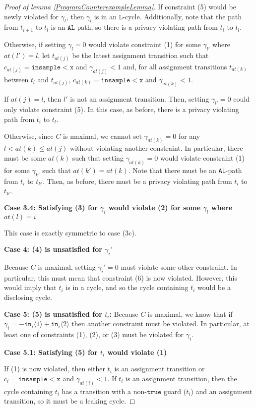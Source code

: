 \documentclass[12pt]{article}
\newcommand{\lguard}[1][x]{\texttt{insample} < #1}
\newcommand{\brangle}[1]{\langle#1 \rangle}
\theoremstyle{definition}
\begin{document}
\begin{proof}[Proof of lemma \ref{ProgramCounterexampleLemma}]
    If constraint (5) would be newly violated for $\gamma_l$, then $\gamma_l$ is in an $\texttt{L}$-cycle. Additionally, note that the path from $t_{i+1}$ to $t_l$ is an $\texttt{AL}$-path, so there is a privacy violating path from $t_i$ to $t_l$. 

    Otherwise, if setting $\gamma_l = 0$ would violate constraint (1) for some $\gamma_{l'}$ where $at(l')=l$, let $t_{at(j)}$ be the latest assignment transition such that $c_{at(j)} = \lguard[\texttt{x}]$ and $\gamma_{at(j)}<1$ and, for all assignment transitions $t_{at(k)}$ between $t_l$ and $t_{at(j)}$, $c_{at(k)} = \lguard[\texttt{x}]$ and $\gamma_{at(k)}<1$. 

    If $at(j) = l$, then $l'$ is not an assignment transition. Then, setting $\gamma_{l'} = 0$ could only violate constraint (5). In this case, as before, there is a privacy violating path from $t_i$ to $t_l$. 

    Otherwise, since $C$ is maximal, we cannot set $\gamma_{at(k)}=0$ for any $l<at(k)\leq at(j)$ without violating another constraint. In particular, there must be some $at(k)$ such that setting $\gamma_{at(k)} = 0$ would violate constraint (1) for some $\gamma_{k'}$ such that $at(k') = at(k)$. Note that there must be an \texttt{AL}-path from $t_i$ to $t_{k'}$. Then, as before, there must be a privacy violating path from $t_i$ to $t_{k'}$. 


    \textbf{Case 3.4: Satisfying (3) for $\gamma_i$ would violate (2) for some $\gamma_l$ where $at(l) = i$} 

    This case is exactly symmetric to case (3c).

    \textbf{Case 4: (4) is unsatisfied for $\gamma_i'$}
    
    Because $C$ is maximal, setting $\gamma_i'=0$ must violate some other constraint. In particular, this must mean that constraint (6) is now violated. However, this would imply that $t_i$ is in a cycle, and so the cycle containing $t_i$ would be a disclosing cycle.

    \textbf{Case 5: (5) is unsatisfied for $t_i$:} Because $C$ is maximal, we know that if $\gamma_i = -\texttt{in}_i\brangle{1}+\texttt{in}_i\brangle{2}$ then another constraint must be violated. In particular, at least one of constraints (1), (2), or (3) must be violated for $\gamma_i$. 
    
    \textbf{Case 5.1: Satisfying (5) for $t_i$ would violate (1)}

    If (1) is now violated, then either $t_i$ is an assignment transition or $c_i = \lguard[\texttt{x}]$ and $\gamma_{at(i)}<1$. If $t_i$ is an assignment transition, then the cycle containing $t_i$ has a transition with a non-$\texttt{true}$ guard ($t_i$) and an assignment transition, so it must be a leaking cycle. 


\end{proof}
\end{document}
